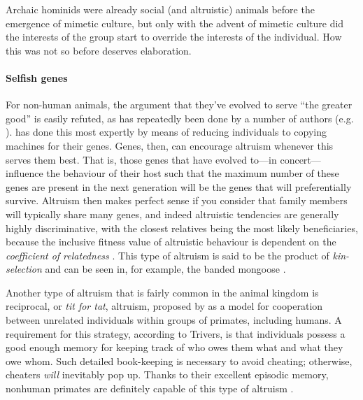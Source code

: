 \documentclass{article}
\begin{document}
Archaic hominids were already social (and altruistic) animals before the
emergence of mimetic culture, but only with the advent of mimetic culture did
the interests of the group start to override the interests of the individual.
How this was not so before deserves elaboration.

\paragraph{Selfish genes}


For non-human animals, the argument that they've evolved to serve “the greater
good” is easily refuted, as has repeatedly been done by a number of authors
(e.g. \citealp{hamilton1964, dawkins1976}). \citet{dawkins1976} has done this
most expertly by means of reducing individuals to copying machines for their
genes. Genes, then, can encourage altruism whenever this serves them best. That
is, those genes that have evolved to---in concert---influence the behaviour of
their host such that the maximum number of these genes are present in the next
generation will be the genes that will preferentially survive. Altruism then
makes perfect sense if you consider that family members will typically share
many genes, and indeed altruistic tendencies are generally highly
discriminative, with the closest relatives being the most likely beneficiaries,
because the inclusive fitness value of altruistic behaviour is dependent on the
\textit{coefficient of relatedness} \citep{hamilton1964}. This type of altruism
is said to be the product of \emph{kin-selection} and can be seen in, for
example, the banded mongoose \citep{gilchrist2004a, gilchrist2004b, hodge2005}.

Another type of altruism that is fairly common in the animal kingdom is
reciprocal, or \emph{tit for tat}, altruism, proposed by \citet{trivers1971}
as a model for cooperation between unrelated individuals within groups
of primates, including humans. A requirement for this strategy, according to
Trivers, is that individuals possess a good enough memory for keeping track of who
owes them what and what they owe whom. Such detailed book-keeping is necessary
to avoid cheating; otherwise, cheaters \textit{will} inevitably pop up.
Thanks to their excellent episodic memory, nonhuman primates are definitely
capable of this type of altruism \citep{waal1996}.
\end{document}
